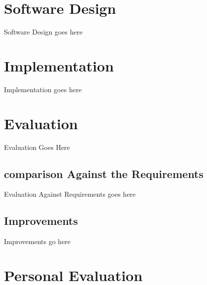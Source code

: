 \documentclass[10pt, a4paper]{article}
\begin{document}
	\section{Software Design}
	Software Design goes here
	
	
	\section{Implementation}
	Implementation goes here
	
	\section{Evaluation}
	Evaluation Goes Here
	
	\subsection{comparison Against the Requirements}
	Evaluation Against Requirements goes here
	
	\subsection{Improvements}
	Improvements go here
    
    
	\section{Personal Evaluation}
		
	
	
		
\end{document}
